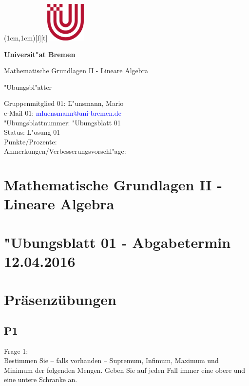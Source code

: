 \documentclass[12pt,a4paper]{article}
\newcommand\header{\textsf{\textbf{\Large \\}}}
\newcommand\headers{\textsf{\textbf{\Large \hspace{2.55cm} Universit"at Bremen}}}
\newcommand\headerf{\textsf{\large \hspace{2.6cm} Mathematische Grundlagen II - Lineare Algebra}}
\newcommand\headerg{\textsf{\large \hspace{2.6cm} "Ubungsbl"atter}}
\newcommand\FIG{\hspace{1.7cm}\includegraphics{Uni-Logo-new2.jpg}}
\begin{document}

\parpic(1cm,1cm)[l][t]{\FIG}
\header\par
\headers\par
\headerf\par
\headerg\par

\vspace{1.1cm}
\begin{flushleft}
\begin{tabbing}
Gruppenmitglied 01: \=L"unsmann, Mario\\[2ex]
e-Mail 01: \>\textcolor{blue}{mluensmann@uni-bremen.de}\\[2ex]
"Ubungsblattnummer: \>"Ubungsblatt 01\\[2ex]
Status: \>L"osung 01\\[8ex]
Punkte/Prozente:\\[16ex]
Anmerkungen/Verbesserungsvorschl"age:
\end{tabbing}
\end{flushleft}

\clearpage

\section*{Mathematische Grundlagen II - Lineare Algebra}

\section*{"Ubungsblatt 01 - Abgabetermin 12.04.2016}

\section{Präsenzübungen}

\subsection{P1}

Frage 1:
\\[2ex]
Bestimmen Sie – falls vorhanden – Supremum, Infimum, Maximum und Minimum der folgenden Mengen. Geben Sie auf jeden Fall immer eine obere und eine untere Schranke an.
\end{document}
